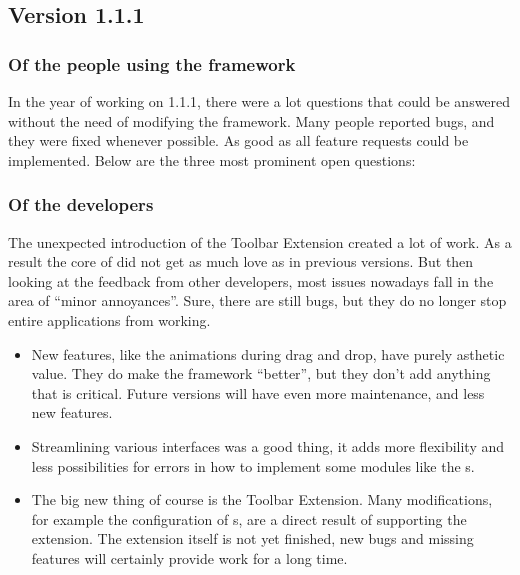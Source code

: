 \subsection{Version 1.1.1}
\subsubsection{Of the people using the framework}
In the year of working on 1.1.1, there were a lot questions that could be answered without the need of modifying the framework. Many people reported bugs, and they were fixed whenever possible. As good as all feature requests could be implemented. Below are the three most prominent open questions:
\begin{itemize}
\end{itemize}
\subsubsection{Of the developers}
The unexpected introduction of the Toolbar Extension created a lot of work. As a result the core of  did not get as much love as in previous versions. But then looking at the feedback from other developers, most issues nowadays fall in the area of ``minor annoyances''. Sure, there are still bugs, but they do no longer stop entire applications from working.
\begin{itemize}
 \item New features, like the animations during drag and drop, have purely asthetic value. They do make the framework ``better'', but they don't add anything that is critical. Future versions will have even more maintenance, and less new features.
 \item Streamlining various interfaces was a good thing, it adds more flexibility and less possibilities for errors in how to implement some modules like the s.
 \item The big new thing of course is the Toolbar Extension. Many modifications, for example the configuration of s, are a direct result of supporting the extension. The extension itself is not yet finished, new bugs and missing features will certainly provide work for a long time.
\end{itemize}
